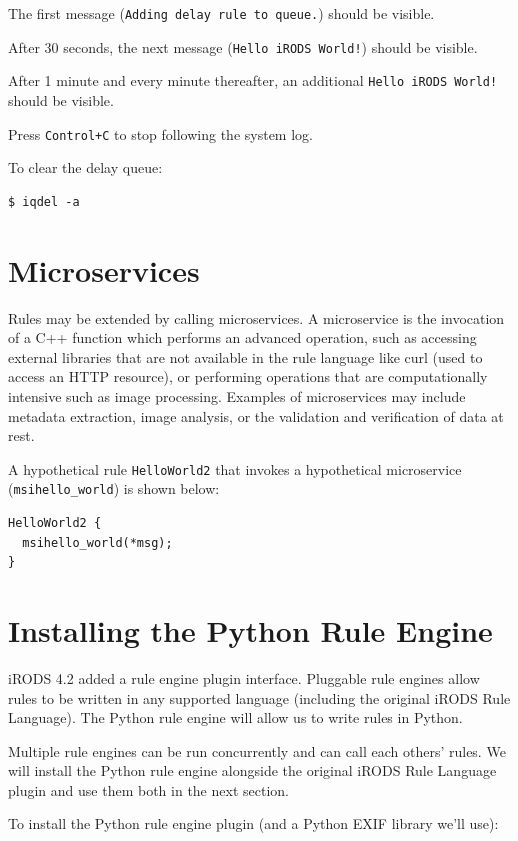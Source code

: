 \documentclass[10pt,oneside]{memoir}
\begin{document}
The first message (\texttt{Adding delay rule to queue.}) should be visible.

After 30 seconds, the next message (\texttt{Hello iRODS World!}) should be visible.

After 1 minute and every minute thereafter, an additional \texttt{Hello iRODS World!} should be visible.

Press \texttt{Control+C} to stop following the system log.

To clear the delay queue:

\begin{lstlisting}
$ iqdel -a
\end{lstlisting}

\section{Microservices}

Rules may be extended by calling microservices. A microservice is the invocation of a C++ function which performs an advanced operation, such as accessing external libraries that are not available in the rule language like curl (used to access an HTTP resource), or performing operations that are computationally intensive such as image processing. Examples of microservices may include metadata extraction, image analysis, or the validation and verification of data at rest.

A hypothetical rule \texttt{HelloWorld2} that invokes a hypothetical microservice (\texttt{msihello\_world}) is shown below:

\begin{lstlisting}
HelloWorld2 {
  msihello_world(*msg);
}
\end{lstlisting}

\section{Installing the Python Rule Engine}

iRODS 4.2 added a rule engine plugin interface.  Pluggable rule engines allow rules to be written in any supported language (including the original iRODS Rule Language).  The Python rule engine will allow us to write rules in Python.

Multiple rule engines can be run concurrently and can call each others' rules.  We will install the Python rule engine alongside the original iRODS Rule Language plugin and use them both in the next section.

To install the Python rule engine plugin (and a Python EXIF library we'll use):
\end{document}
